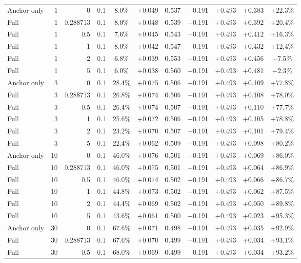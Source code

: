 \begin{table}[htbp]
\begin{tabular}{lrrrccccccc}
Anchor only & 1 & 0 & 0.1 & 8.0\% & +0.049 & 0.537 & +0.191 & +0.493 & +0.383 & +22.3\% \\
Full & 1 & 0.288713 & 0.1 & 8.0\% & +0.048 & 0.539 & +0.191 & +0.493 & +0.392 & +20.4\% \\
Full & 1 & 0.5 & 0.1 & 7.6\% & +0.045 & 0.543 & +0.191 & +0.493 & +0.412 & +16.3\% \\
Full & 1 & 1 & 0.1 & 8.0\% & +0.042 & 0.547 & +0.191 & +0.493 & +0.432 & +12.4\% \\
Full & 1 & 2 & 0.1 & 6.8\% & +0.039 & 0.553 & +0.191 & +0.493 & +0.456 & +7.5\% \\
Full & 1 & 5 & 0.1 & 6.0\% & +0.038 & 0.560 & +0.191 & +0.493 & +0.481 & +2.3\% \\
Anchor only & 3 & 0 & 0.1 & 28.4\% & +0.075 & 0.506 & +0.191 & +0.493 & +0.109 & +77.8\% \\
Full & 3 & 0.288713 & 0.1 & 26.8\% & +0.074 & 0.506 & +0.191 & +0.493 & +0.108 & +78.0\% \\
Full & 3 & 0.5 & 0.1 & 26.4\% & +0.074 & 0.507 & +0.191 & +0.493 & +0.110 & +77.7\% \\
Full & 3 & 1 & 0.1 & 25.6\% & +0.072 & 0.506 & +0.191 & +0.493 & +0.105 & +78.8\% \\
Full & 3 & 2 & 0.1 & 23.2\% & +0.070 & 0.507 & +0.191 & +0.493 & +0.101 & +79.4\% \\
Full & 3 & 5 & 0.1 & 22.4\% & +0.062 & 0.509 & +0.191 & +0.493 & +0.098 & +80.2\% \\
Anchor only & 10 & 0 & 0.1 & 46.0\% & +0.076 & 0.501 & +0.191 & +0.493 & +0.069 & +86.0\% \\
Full & 10 & 0.288713 & 0.1 & 46.0\% & +0.075 & 0.501 & +0.191 & +0.493 & +0.064 & +86.9\% \\
Full & 10 & 0.5 & 0.1 & 46.0\% & +0.074 & 0.502 & +0.191 & +0.493 & +0.066 & +86.7\% \\
Full & 10 & 1 & 0.1 & 44.8\% & +0.073 & 0.502 & +0.191 & +0.493 & +0.062 & +87.5\% \\
Full & 10 & 2 & 0.1 & 44.4\% & +0.069 & 0.502 & +0.191 & +0.493 & +0.050 & +89.8\% \\
Full & 10 & 5 & 0.1 & 43.6\% & +0.061 & 0.500 & +0.191 & +0.493 & +0.023 & +95.3\% \\
Anchor only & 30 & 0 & 0.1 & 67.6\% & +0.071 & 0.498 & +0.191 & +0.493 & +0.035 & +92.9\% \\
Full & 30 & 0.288713 & 0.1 & 67.6\% & +0.070 & 0.499 & +0.191 & +0.493 & +0.034 & +93.1\% \\
Full & 30 & 0.5 & 0.1 & 68.0\% & +0.069 & 0.499 & +0.191 & +0.493 & +0.034 & +93.2\% \\

\end{tabular}
\end{table}
